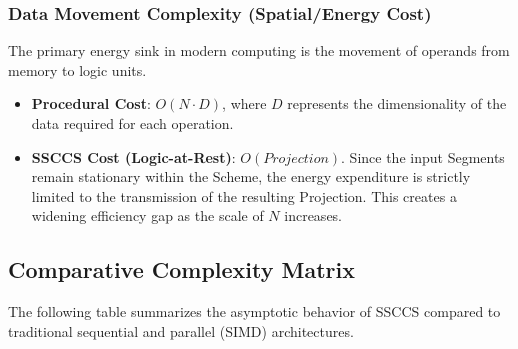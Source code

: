 \documentclass[
  a4paper,
  DIV=11,
  numbers=noendperiod]{scrartcl}
\providecommand{\tightlist}{%
  \setlength{\itemsep}{0pt}\setlength{\parskip}{0pt}}
\begin{document}
\subsubsection{Data Movement Complexity (Spatial/Energy
Cost)}\label{data-movement-complexity-spatialenergy-cost}

The primary energy sink in modern computing is the movement of operands
from memory to logic units.

\begin{itemize}
\tightlist
\item
  \textbf{Procedural Cost}: \(O(N \cdot D)\), where \(D\) represents the
  dimensionality of the data required for each operation.
\item
  \textbf{SSCCS Cost (Logic-at-Rest)}: \(O(Projection)\). Since the
  input Segments remain stationary within the Scheme, the energy
  expenditure is strictly limited to the transmission of the resulting
  Projection. This creates a widening efficiency gap as the scale of
  \(N\) increases.
\end{itemize}

\subsection{Comparative Complexity
Matrix}\label{comparative-complexity-matrix}

The following table summarizes the asymptotic behavior of SSCCS compared
to traditional sequential and parallel (SIMD) architectures.
\end{document}
